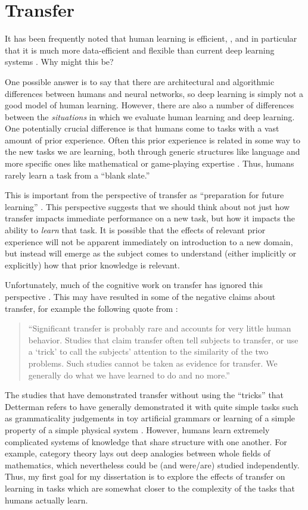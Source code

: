 \documentclass[11pt]{article}
\begin{document}
\section{Transfer}
It has been frequently noted that human learning is efficient, \citep[e.g.]{Gentner2003}, and in particular that it is much more data-efficient and flexible than current deep learning systems \citep{Lake2016}. Why might this be? \par
One possible answer is to say that there are architectural and algorithmic differences between humans and neural networks, so deep learning is simply not a good model of human learning. However, there are also a number of differences between the \emph{situations} in which we evaluate human learning and deep learning. One potentially crucial difference is that humans come to tasks with a vast amount of prior experience. Often this prior experience is related in some way to the new tasks we are learning, both through generic structures like language and more specific ones like mathematical or game-playing expertise \citep{Hansen2017}. Thus, humans rarely learn a task from a ``blank slate.'' \par
This is important from the perspective of transfer as ``preparation for future learning'' \citep{Bransford1999}. This perspective suggests that we should think about not just how transfer impacts immediate performance on a new task, but how it impacts the ability to \emph{learn} that task. It is possible that the effects of relevant prior experience will not be apparent immediately on introduction to a new domain, but instead will emerge as the subject comes to understand (either implicitly or explicitly) how that prior knowledge is relevant. \par 
Unfortunately, much of the cognitive work on transfer has ignored this perspective \citep{Bransford1999}. This may have resulted in some of the negative claims about transfer, for example the following quote from \citet{Detterman1993}: 
\begin{quote}
``Significant transfer is probably rare and accounts for very little human behavior. Studies that claim transfer often tell subjects to transfer, or use a `trick' to call the subjects' attention to the similarity of the two problems. Such studies cannot be taken as evidence for transfer. We generally do what we have learned to do and no more.''
\end{quote}
The studies that have demonstrated transfer without using the ``tricks'' that Detterman refers to have generally demonstrated it with quite simple tasks such as grammaticality judgements in toy artificial grammars \citep[e.g.]{Tunney2001} or learning of a simple property of a simple physical system \citep{Day2011}. However, humans learn extremely complicated systems of knowledge that share structure with one another. For example, category theory lays out deep analogies between whole fields of mathematics, which nevertheless could be (and were/are) studied independently. Thus, my first goal for my dissertation is to explore the effects of transfer on learning in tasks which are somewhat closer to the complexity of the tasks that humans actually learn. \par
\end{document}
